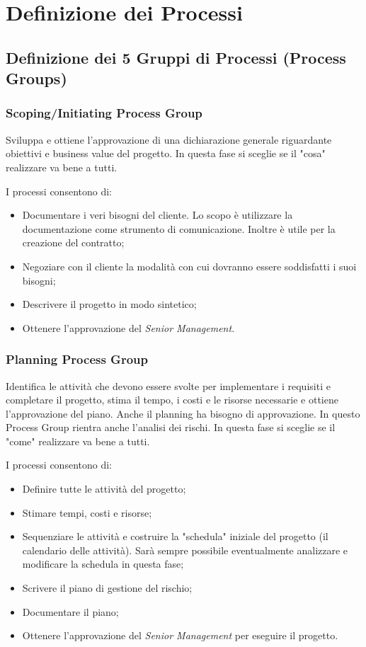 \section{Definizione dei Processi}
\subsection{Definizione dei 5 Gruppi di Processi (Process Groups)}
\subsubsection{Scoping/Initiating Process Group}
\begin{info}
	Sviluppa e ottiene l'approvazione di una dichiarazione generale riguardante obiettivi e business value del progetto. In questa fase si sceglie se il "cosa" realizzare va bene a tutti.
\end{info}
I processi consentono di:
\begin{itemize}
	\item Documentare i veri bisogni del cliente. Lo scopo è utilizzare la documentazione come strumento di comunicazione. Inoltre è utile per la creazione del contratto;
	\item Negoziare con il cliente la modalità con cui dovranno essere soddisfatti i suoi bisogni;
	\item Descrivere il progetto in modo sintetico;
	\item Ottenere l'approvazione del \textit{Senior Management}.
\end{itemize}
\subsubsection{Planning Process Group}
\begin{info}
	Identifica le attività che devono essere svolte per implementare i requisiti e completare il progetto, stima il tempo, i costi e le risorse necessarie e ottiene l'approvazione del piano. Anche il planning ha bisogno di approvazione. In questo Process Group rientra anche l'analisi dei rischi. In questa fase si sceglie se il "come" realizzare va bene a tutti.
\end{info}
I processi consentono di:
\begin{itemize}
	\item Definire tutte le attività del progetto;
	\item Stimare tempi, costi e risorse;
	\item Sequenziare le attività e costruire la "schedula" iniziale del progetto (il calendario delle attività). Sarà sempre possibile eventualmente analizzare e modificare la schedula in questa fase;
	\item Scrivere il piano di gestione del rischio;
	\item Documentare il piano;
	\item Ottenere l'approvazione del \textit{Senior Management} per eseguire il progetto.
\end{itemize}
